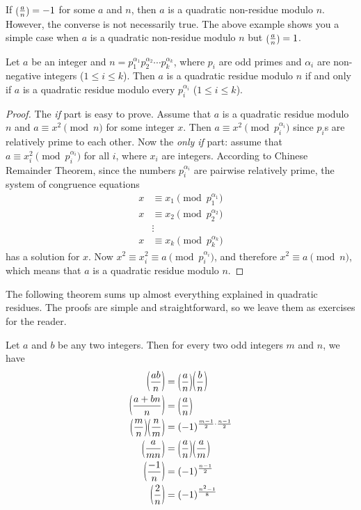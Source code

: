 \documentclass[main.tex]{subfile}
\begin{document}
	\begin{note}
		If $\parenthesis{\frac{a}{n}}=-1$ for some $a$ and $n$, then $a$ is a quadratic non-residue modulo $n$. However, the converse is not necessarily true. The above example shows you a simple case when $a$ is a quadratic non-residue modulo $n$ but $\parenthesis{\frac{a}{n}}=1$.
	\end{note}

	\begin{theorem}
		Let $a$ be an integer and $n=p_1^{\alpha_1}p_2^{\alpha_2}\cdots p_k^{\alpha_k}$, where $p_i$ are odd primes and $\alpha_i$ are non-negative integers ($1 \leq i \leq k$). Then $a$ is a quadratic residue modulo $n$ if and only if $a$ is a quadratic residue modulo every $p_i^{\alpha_i}$  ($1 \leq i \leq k$).
	\end{theorem}

	\begin{proof}
		The \textit{if} part is easy to prove. Assume that $a$ is a quadratic residue modulo $n$ and $a \equiv x^2 \pmod n$ for some integer $x$. Then $a \equiv x^2 \pmod{p_i^{\alpha_i}}$ since $p_i$s are relatively prime to each other. Now the \textit{only if} part: assume that $a \equiv x_i^2 \pmod{p_i^{\alpha_i}}$ for all $i$, where $x_i$ are integers. According to Chinese Remainder Theorem, since the numbers ${p_i^{\alpha_i}}$ are pairwise relatively prime, the system of congruence equations
		\begin{align*}
			x & \equiv x_1\pmod{p_1^{\alpha_1}}\\
			x & \equiv x_2\pmod{p_2^{\alpha_2}}\\
			& \vdots\\
			x & \equiv x_k\pmod{p_k^{\alpha_k}}
		\end{align*}
		has a solution for $x$. Now $x^2 \equiv x_i^2 \equiv a \pmod{p_i^{\alpha_i}}$, and therefore $x^2 \equiv a \pmod n$, which means that $a$ is a quadratic residue modulo $n$.
	\end{proof}

	The following theorem sums up almost everything explained in quadratic residues. The proofs are simple and straightforward, so we leave them as exercises for the reader.
		\begin{theorem}
			Let $a$ and $b$ be any two integers. Then for every two odd integers $m$ and $n$, we have
				\begin{align*}
					\parenthesis{\frac{ab}{n}}
						& = \parenthesis{\frac{a}{n}}\parenthesis{\frac{b}{n}}\\
					\parenthesis{\frac{a+bn}{n}}
						& = \parenthesis{\frac{a}{n}}\\
					\parenthesis{\dfrac{m}{n}}\parenthesis{\dfrac{n}{m}}
						& = (-1)^{\frac{m-1}{2}\cdot \frac{n-1}{2}}\\
					\parenthesis{\frac{a}{mn}}
						& = \parenthesis{\frac{a}{n}}\parenthesis{\frac{a}{m}}\\
					\parenthesis{\frac{-1}{n}}
						& = (-1)^{\frac{n-1}{2}}\\
					\parenthesis{\frac{2}{n}}
						& = (-1)^{\frac{n^2-1}{8}}
				\end{align*}
		\end{theorem}
\end{document}
